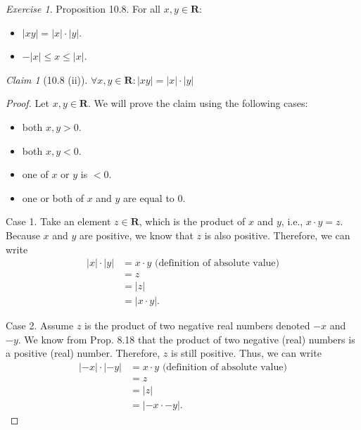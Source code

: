 \documentclass[12pt,oneside]{amsart}
\theoremstyle{remark}
\newtheorem{exer}{Exercise}
\newtheorem{claim}{Claim}[exer]
\newcommand{\bfR}{\mathbf{R}}
\begin{document}
%
%
%
%
\newpage
\begin{exer}
Proposition 10.8. For all $x, y \in \bfR$:
\begin{itemize}
  \item[ (ii) ] $|xy| = |x| \cdot |y|$.
  \item[ (iii) ] $-|x| \leq x \leq |x|$.
\end{itemize}
\end{exer}
\begin{claim}[10.8 (ii)]
$\forall x, y \in \bfR: |xy| = |x| \cdot |y|$
\end{claim}
\begin{proof}
Let $x, y \in \bfR$. We will prove the claim using the following cases:
\begin{itemize}
  \item[1.] both $x, y > 0$.
  \item[2.] both $x, y < 0$.
  \item[3.] one of $x$ or $y$ is $<0$.
  \item[4.] one or both of $x$ and $y$ are equal to 0.
\end{itemize}

Case 1. Take an element $z \in \bfR$, which is the product of $x$ and $y$, i.e., $x \cdot y = z$. Because $x$ and $y$ are positive, we know that $z$ is also positive. Therefore, we can write
\begin{equation}
\begin{split}
|x| \cdot |y| &= x \cdot y\text{ (definition of absolute value)} \\
              &= z \\
              &= |z| \\
              &= |x \cdot y|.
\end{split}
\end{equation}

Case 2. Assume $z$ is the product of two negative real numbers denoted $-x$ and $-y$. We know from Prop. 8.18 that the product of two negative (real) numbers is a positive (real) number. Therefore, $z$ is still positive. Thus, we can write
\begin{equation}
\begin{split}
|-x| \cdot |-y| &= x \cdot y \text{ (definition of absolute value)} \\
                &= z \\
                &= |z| \\
                &= |-x \cdot -y|.
\end{split}
\end{equation}


\end{proof}
\end{document}
